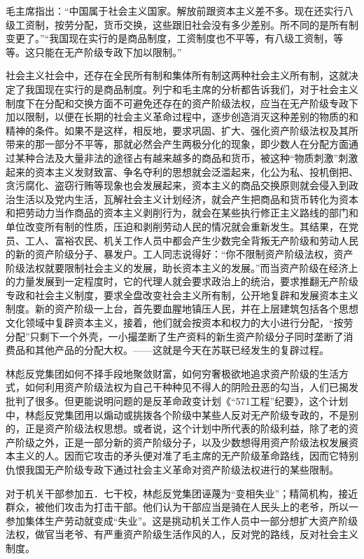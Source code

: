 \begin{maonote}
毛主席指出：“中国属于社会主义国家。解放前跟资本主义差不多。现在还实行八级工资制，按劳分配，货币交换，这些跟旧社会没有多少差别。所不同的是所有制变更了。”“我国现在实行的是商品制度，工资制度也不平等，有八级工资制，等等。这只能在无产阶级专政下加以限制。”

社会主义社会中，还存在全民所有制和集体所有制这两种社会主义所有制，这就决定了我国现在实行的是商品制度。列宁和毛主席的分析都告诉我们，对于社会主义制度下在分配和交换方面不可避免还存在的资产阶级法权，应当在无产阶级专政下加以限制，以便在长期的社会主义革命过程中，逐步创造消灭这种差别的物质的和精神的条件。如果不是这样，相反地，要求巩固、扩大、强化资产阶级法权及其所带来的那一部分不平等，那就必然会产生两极分化的现象，即少数人在分配方面通过某种合法及大量非法的途径占有越来越多的商品和货币，被这种“物质刺激”刺激起来的资本主义发财致富、争名夺利的思想就会泛滥起来，化公为私、投机倒把、贪污腐化、盗窃行贿等现象也会发展起来，资本主义的商品交换原则就会侵入到政治生活以及党内生活，瓦解社会主义计划经济，就会产生把商品和货币转化为资本和把劳动力当作商品的资本主义剥削行为，就会在某些执行修正主义路线的部门和单位改变所有制的性质，压迫和剥削劳动人民的情况就会重新发生。其结果，在党员、工人、富裕农民、机关工作人员中都会产生少数完全背叛无产阶级和劳动人民的新的资产阶级分子、暴发户。工人同志说得好：“你不限制资产阶级法权，资产阶级法权就要限制社会主义的发展，助长资本主义的发展。”而当资产阶级在经济上的力量发展到一定程度时，它的代理人就会要求政治上的统治，要求推翻无产阶级专政和社会主义制度，要求全盘改变社会主义所有制，公开地复辟和发展资本主义制度。新的资产阶级一上台，首先要血腥地镇压人民，并在上层建筑包括各个思想文化领域中复辟资本主义，接着，他们就会按资本和权力的大小进行分配，“按劳分配”只剩下一个外壳，一小撮垄断了生产资料的新生资产阶级分子同时垄断了消费品和其他产品的分配大权。——这就是今天在苏联已经发生的复辟过程。

林彪反党集团如何不择手段地聚敛财富，如何穷奢极欲地追求资产阶级的生活方式，如何利用资产阶级法权为自己干种种见不得人的阴险丑恶的勾当，人们已揭发批判了很多。但更能说明问题的是反革命政变计划《“571工程”纪要》，这个计划中，林彪反党集团用以煽动或挑拨各个阶级中某些人反对无产阶级专政的，不是别的，正是资产阶级法权思想。或者说，这个计划中所代表的阶级利益，除了老的资产阶级之外，正是一部分新的资产阶级分子，以及少数想得用资产阶级法权发展资本主义的人。因而它攻击的矛头便对准了毛主席的无产阶级革命路线，因而它特别仇恨我国无产阶级专政下通过社会主义革命对资产阶级法权进行的某些限制。

对于机关干部参加五．七干校，林彪反党集团诬蔑为“变相失业”；精简机构，接近群众，被他们攻击为打击干部。他们认为干部应当是骑在人民头上的老爷，所以一参加集体生产劳动就变成“失业”。这是挑动机关工作人员中一部分想扩大资产阶级法权，做官当老爷、有严重资产阶级生活作风的人，反对党的路线，反对社会主义制度。


\end{maonote}
